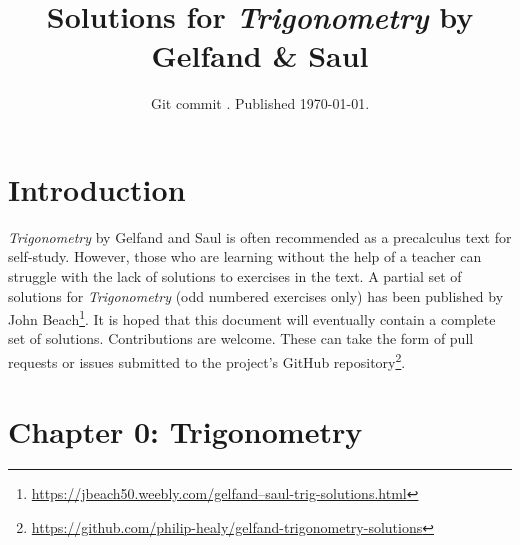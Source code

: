 \documentclass{article}
\title{Solutions for \textit{Trigonometry} by Gelfand \& Saul}
\author{}
\date{Git commit \texttt{\abbrevcommit}. Published \today.}
\newenvironment{solutions}[1]
{\subsection*{#1}
 \begin{enumerate}[leftmargin=1.5em]}
{\end{enumerate}}
\newcommand{\solution}{\item}
\begin{document}
\maketitle
\doclicenseThis

\section*{Introduction}
\textit{Trigonometry} by Gelfand and Saul is often recommended as a precalculus text for self-study.
However, those who are learning without the help of a teacher can struggle with the lack of solutions to exercises in the text.
A partial set of solutions for \textit{Trigonometry} (odd numbered exercises only) has been published by John Beach\footnote{\href{https://jbeach50.weebly.com/gelfand--saul-trig-solutions.html}{https://jbeach50.weebly.com/gelfand--saul-trig-solutions.html}}.
It is hoped that this document will eventually contain a complete set of solutions.
Contributions are welcome. These can take the form of pull requests or issues submitted to the project's GitHub repository\footnote{\href{https://github.com/philip-healy/gelfand-trigonometry-solutions}{https://github.com/philip-healy/gelfand-trigonometry-solutions}}.

\section*{Chapter 0: Trigonometry}

\begin{comment}
\begin{solutions}{Page 3}
\solution
\solution
\solution
\end{solutions}

\begin{solutions}{Page 5}
\solution
\solution
\end{solutions}
\end{comment}
\end{document}
